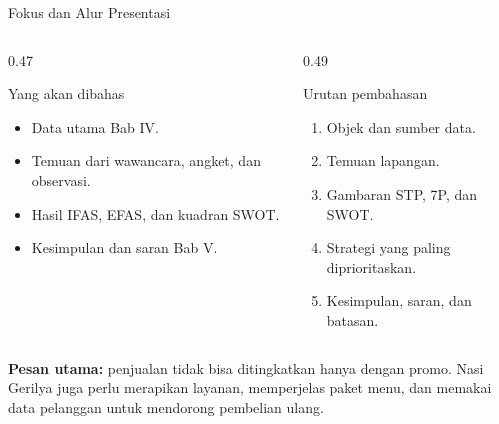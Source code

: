 \documentclass[aspectratio=169,11pt]{beamer}
\newcommand{\strong}[1]{\textbf{\textcolor{usuGreen!85!black}{#1}}}
\begin{document}
\begin{frame}{Fokus dan Alur Presentasi}
\small
\begin{columns}[T,onlytextwidth]
    \begin{column}{0.47\textwidth}
        \begin{block}{Yang akan dibahas}
            \begin{itemize}
                \item Data utama Bab IV.
                \item Temuan dari wawancara, angket, dan observasi.
                \item Hasil IFAS, EFAS, dan kuadran SWOT.
                \item Kesimpulan dan saran Bab V.
            \end{itemize}
        \end{block}
    \end{column}
    \begin{column}{0.49\textwidth}
        \begin{block}{Urutan pembahasan}
            \begin{enumerate}
                \item Objek dan sumber data.
                \item Temuan lapangan.
                \item Gambaran STP, 7P, dan SWOT.
                \item Strategi yang paling diprioritaskan.
                \item Kesimpulan, saran, dan batasan.
            \end{enumerate}
        \end{block}
    \end{column}
\end{columns}
\vspace{0.2cm}
\begin{center}
    \strong{Pesan utama:} penjualan tidak bisa ditingkatkan hanya dengan promo. Nasi Gerilya juga perlu merapikan layanan, memperjelas paket menu, dan memakai data pelanggan untuk mendorong pembelian ulang.
\end{center}
\end{frame}
\end{document}
